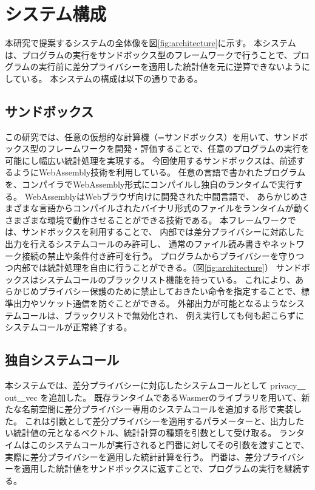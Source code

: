 \documentclass[a4paper,11pt]{jreport}
\begin{document}
\section{システム構成}

本研究で提案するシステムの全体像を図\ref{fig:architecture}に示す。
本システムは、プログラムの実行をサンドボックス型のフレームワークで行うことで、プログラムの実行前に差分プライバシーを適用した統計値を元に逆算できないようにしている。
本システムの構成は以下の通りである。

\subsection{サンドボックス}

この研究では、任意の仮想的な計算機（=サンドボックス）を用いて、サンドボックス型のフレームワークを開発・評価することで、任意のプログラムの実行を可能にし幅広い統計処理を実現する。
今回使用するサンドボックスは、前述するようにWebAssembly技術を利用している。
任意の言語で書かれたプログラムを、コンパイラでWebAssembly形式にコンパイルし独自のランタイムで実行する。
WebAssemblyはWebブラウザ向けに開発された中間言語で、
あらかじめさまざまな言語からコンパイルされたバイナリ形式のファイルをランタイムが動くさまざまな環境で動作させることができる技術である。
本フレームワークでは、サンドボックスを利用することで、
内部では差分プライバシーに対応した出力を行えるシステムコールのみ許可し、
通常のファイル読み書きやネットワーク接続の禁止や条件付き許可を行う。
プログラムからプライバシーを守りつつ内部では統計処理を自由に行うことができる。（図\ref{fig:architecture}）
サンドボックスはシステムコールのブラックリスト機能を持っている。
これにより、あらかじめプライバシー保護のために禁止しておきたい命令を指定することで、標準出力やソケット通信を防ぐことができる。
外部出力が可能となるようなシステムコールは、ブラックリストで無効化され、
例え実行しても何も起こらずにシステムコールが正常終了する。

\subsection{独自システムコール}

本システムでは、差分プライバシーに対応したシステムコールとして privacy＿out＿vec を追加した。
既存ランタイムであるWasmerのライブラリを用いて、新たな名前空間に差分プライバシー専用のシステムコールを追加する形で実装した。
これは引数として差分プライバシーを適用するパラメーターと、出力したい統計値の元となるベクトル、統計計算の種類を引数として受け取る。
ランタイムはこのシステムコールが実行されると門番に対してその引数を渡すことで、実際に差分プライバシーを適用した統計計算を行う。
門番は、差分プライバシーを適用した統計値をサンドボックスに返すことで、プログラムの実行を継続する。
\end{document}
